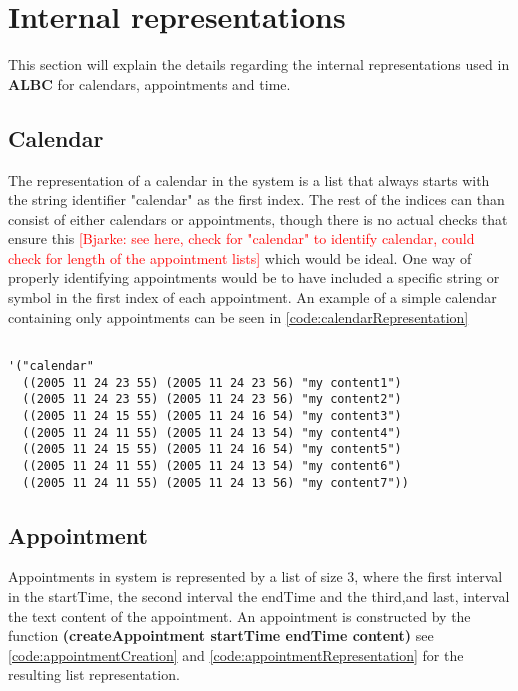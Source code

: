 \documentclass{IOS-Book-Article}
\newcommand{\bjarke}[1]{\textcolor{red}{[Bjarke: #1]}}
\begin{document}
\section{Internal representations} \label{sec:internalrepresentations}
This section will explain the details regarding the internal representations used in \textbf{ALBC} for calendars, appointments and time. 

\subsection{Calendar}
The representation of a calendar in the system is a list that always starts with the string identifier "calendar" as the first index. The rest of the indices can than consist of either calendars or appointments, though there is no actual checks that ensure this \bjarke{see here, check for "calendar" to identify calendar, could check for length of the appointment lists} which would be ideal. One way of properly identifying appointments would be to have included a specific string or symbol in the first index of each appointment. An example of a simple calendar containing only appointments can be seen in \autoref{code:calendarRepresentation}

\begin{lstlisting}[frame=single, caption={Calendar representation}, label={code:calendarRepresentation}] 

'("calendar"
  ((2005 11 24 23 55) (2005 11 24 23 56) "my content1")
  ((2005 11 24 23 55) (2005 11 24 23 56) "my content2")
  ((2005 11 24 15 55) (2005 11 24 16 54) "my content3")
  ((2005 11 24 11 55) (2005 11 24 13 54) "my content4")
  ((2005 11 24 15 55) (2005 11 24 16 54) "my content5")
  ((2005 11 24 11 55) (2005 11 24 13 54) "my content6")
  ((2005 11 24 11 55) (2005 11 24 13 56) "my content7"))
\end{lstlisting}



\subsection{Appointment}
Appointments in system is represented by a list of size 3, where the first interval in the startTime, the second interval the endTime and the third,and last, interval the text content of the appointment. An appointment is constructed by the function \textbf{(createAppointment startTime endTime content)} see \autoref{code:appointmentCreation} and \autoref{code:appointmentRepresentation} for the resulting list representation.
\end{document}
